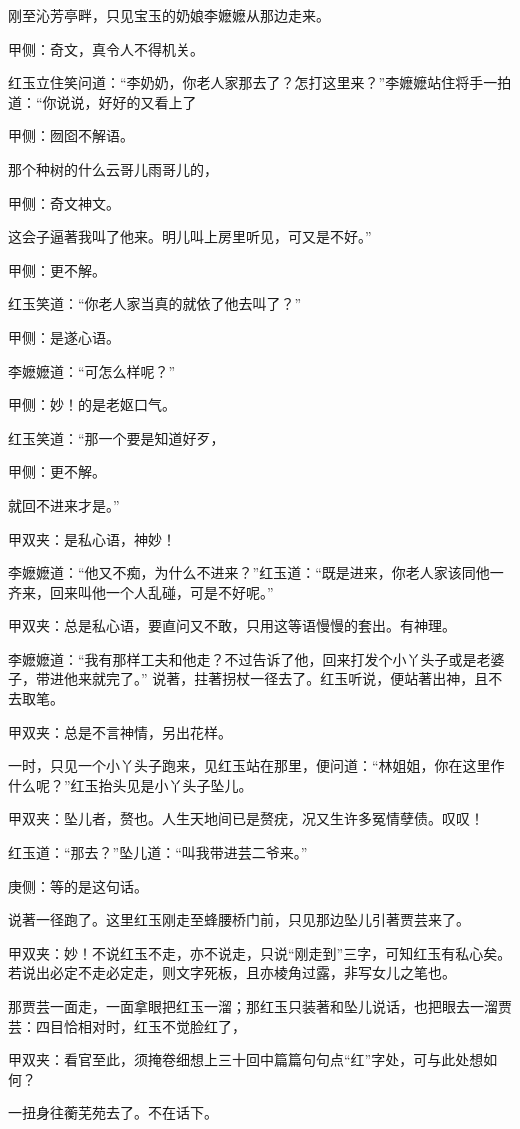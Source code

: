 \begin{parag}
    刚至沁芳亭畔，只见宝玉的奶娘李嬷嬷从那边走来。\begin{note}甲侧：奇文，真令人不得机关。\end{note}红玉立住笑问道：“李奶奶，你老人家那去了？怎打这里来？”李嬷嬷站住将手一拍道：“你说说，好好的又看上了\begin{note}甲侧：囫囵不解语。\end{note}那个种树的什么云哥儿雨哥儿的，\begin{note}甲侧：奇文神文。\end{note}这会子逼著我叫了他来。明儿叫上房里听见，可又是不好。”\begin{note}甲侧：更不解。\end{note}红玉笑道：“你老人家当真的就依了他去叫了？”\begin{note}甲侧：是遂心语。\end{note}李嬷嬷道：“可怎么样呢？”\begin{note}甲侧：妙！的是老妪口气。\end{note}红玉笑道：“那一个要是知道好歹，\begin{note}甲侧：更不解。\end{note}就回不进来才是。”\begin{note}甲双夹：是私心语，神妙！\end{note}李嬷嬷道：“他又不痴，为什么不进来？”红玉道：“既是进来，你老人家该同他一齐来，回来叫他一个人乱碰，可是不好呢。”\begin{note}甲双夹：总是私心语，要直问又不敢，只用这等语慢慢的套出。有神理。\end{note}李嬷嬷道：“我有那样工夫和他走？不过告诉了他，回来打发个小丫头子或是老婆子，带进他来就完了。” 说著，拄著拐杖一径去了。红玉听说，便站著出神，且不去取笔。\begin{note}甲双夹：总是不言神情，另出花样。\end{note}
\end{parag}


\begin{parag}
    一时，只见一个小丫头子跑来，见红玉站在那里，便问道：“林姐姐，你在这里作什么呢？”红玉抬头见是小丫头子坠儿。\begin{note}甲双夹：坠儿者，赘也。人生天地间已是赘疣，况又生许多冤情孽债。叹叹！\end{note}红玉道：“那去？”坠儿道：“叫我带进芸二爷来。”\begin{note}庚侧：等的是这句话。\end{note}说著一径跑了。这里红玉刚走至蜂腰桥门前，只见那边坠儿引著贾芸来了。\begin{note}甲双夹：妙！不说红玉不走，亦不说走，只说“刚走到”三字，可知红玉有私心矣。若说出必定不走必定走，则文字死板，且亦棱角过露，非写女儿之笔也。\end{note}那贾芸一面走，一面拿眼把红玉一溜；那红玉只装著和坠儿说话，也把眼去一溜贾芸：四目恰相对时，红玉不觉脸红了，\begin{note}甲双夹：看官至此，须掩卷细想上三十回中篇篇句句点“红”字处，可与此处想如何？\end{note}一扭身往蘅芜苑去了。不在话下。
\end{parag}



